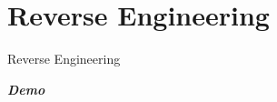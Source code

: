 \section{Reverse Engineering}

\begin{frame}{Reverse Engineering}

  \begin{center}
  \Huge \emph{\textbf{Demo}}
  \end{center}

\end{frame}
